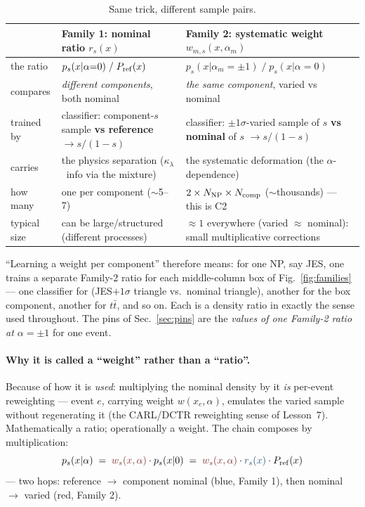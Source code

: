 \documentclass[11pt]{article}
\newcommand{\kl}{\ensuremath{\kappa_\lambda}}
\begin{document}
\begin{table}[htbp]\centering\small
\begin{tabular}{@{}p{}p{}p{}@{}}
\toprule
 & \textbf{Family 1: nominal ratio $r_s(x)$} & \textbf{Family 2: systematic weight $w_{m,s}(x,\alpha_m)$}\\
\midrule
the ratio & $p_s(x|\alpha{=}0)\;/\;P_{\rm ref}(x)$ & $p_s(x|\alpha_m{=}{\pm}1)\;/\;p_s(x|\alpha{=}0)$\\
compares & \emph{different components}, both nominal & \emph{the same component}, varied vs nominal\\
trained by & classifier: component-$s$ sample \textbf{vs reference} $\to s/(1{-}s)$ & classifier: $\pm1\sigma$-varied
  sample of $s$ \textbf{vs nominal} of $s$ $\to s/(1{-}s)$\\
carries & the physics separation (\kl\ info via the mixture) & the systematic deformation (the $\alpha$-dependence)\\
how many & one per component ($\sim$5--7) & $2\times N_{\rm NP}\times N_{\rm comp}$ ($\sim$thousands) --- this is C2\\
typical size & can be large/structured (different processes) & $\approx1$ everywhere (varied $\approx$ nominal):
  small multiplicative corrections\\
\bottomrule
\end{tabular}
\caption{Same trick, different sample pairs.}
\label{tab:families}
\end{table}

``Learning a weight per component'' therefore means: for one NP, say JES, one trains a separate Family-2 ratio
for each middle-column box of Fig.~\ref{fig:families} --- one classifier for (JES$+1\sigma$ triangle vs.\
nominal triangle), another for the box component, another for $t\bar t$, and so on. Each is a density ratio in
exactly the sense used throughout. The pins of Sec.~\ref{sec:pins} are the \emph{values of one Family-2 ratio at
$\alpha=\pm1$} for one event.

\paragraph{Why it is called a ``weight'' rather than a ``ratio''.} Because of how it is \emph{used}:
multiplying the nominal density by it \emph{is} per-event reweighting --- event $e$, carrying weight
$w(x_e,\alpha)$, emulates the varied sample without regenerating it (the CARL/DCTR reweighting sense of
Lesson~7). Mathematically a ratio; operationally a weight. The chain composes by multiplication:
\begin{equation}
p_s(x|\alpha)\;=\;{\color{accent}w_s(x,\alpha)}\cdot p_s(x|0)
\;=\;{\color{accent}w_s(x,\alpha)}\cdot{\color{famone}r_s(x)}\cdot P_{\rm ref}(x)
\end{equation}
--- two hops: reference $\to$ component nominal (blue, Family 1), then nominal $\to$ varied (red, Family 2).
\end{document}

